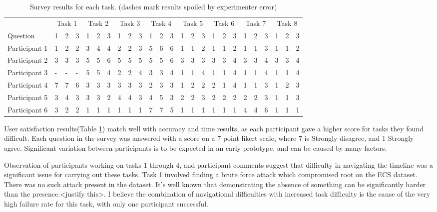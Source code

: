 \begin{table}[tbh]
\centering
\begin{tabular}{l|| l|l|l|| l|l|l|| l|l|l|| l|l|l|| l|l|l|| l|l|l|| l|l|l|| l|l|l||} & 
\multicolumn{3}{|c|}{Task 1} & 
\multicolumn{3}{|c|}{Task 2} &
\multicolumn{3}{|c|}{Task 3} & 
\multicolumn{3}{|c|}{Task 4} &
\multicolumn{3}{|c|}{Task 5} &
\multicolumn{3}{|c|}{Task 6} &
\multicolumn{3}{|c|}{Task 7} &
\multicolumn{3}{|c|}{Task 8} \\
Question&1&2&3&1&2&3&1&2&3&1&2&3&1&2&3&1&2&3&1&2&3&1&2&3 \\
\hline
Participant 1 &1&2&2&3&4&4&2&2&3&5&6&6&1&1&2&1&1&2&1&1&3&1&1&2\\
Participant 2 &3&3&3&5&5&6&5&5&5&5&5&6&3&3&3&3&3&4&3&3&4&3&3&4\\
Participant 3 &-&-&-&5&5&4&2&2&4&3&3&4&1&1&4&1&1&4&1&1&4&1&1&4\\
Participant 4 &7&7&6&3&3&3&3&3&3&2&3&3&1&2&2&2&1&4&1&1&3&1&2&3\\
Participant 5 &3&4&3&3&3&2&4&4&3&4&5&3&2&2&3&2&2&2&2&2&3&1&1&3\\
Participant 6 &3&2&2&1&1&1&1&1&1&7&7&5&1&1&1&1&1&1&4&4&6&1&1&1\\
\end{tabular}
\caption{Survey results for each task. (dashes mark results spoiled by experimenter error)}
\label{res_survey}
\end{table}

User satisfaction results(Table \ref{res_survey}) match well with accuracy and time results, as each participant gave a higher score for tasks they found difficult. Each question in the survey was answered with a score on a 7 point likert scale, where 7 is Strongly disagree, and 1 Strongly agree. Significant variation between participants is to be expected in an early prototype, and can be caused by many factors. 

Observation of participants working on tasks 1 through 4, and participant comments suggest that difficulty in navigating the timeline was a significant issue for carrying out these tasks.
Task 1 involved finding a brute force attack which compromised root on the ECS dataset. There was no such attack present in the dataset. It's well known that demonstrating the absence of something can be significantly harder than the presence.<justify this>. I believe the combination of navigational difficulties with increased task difficulty is the cause of the very high failure rate for this task, with only one participant successful.

